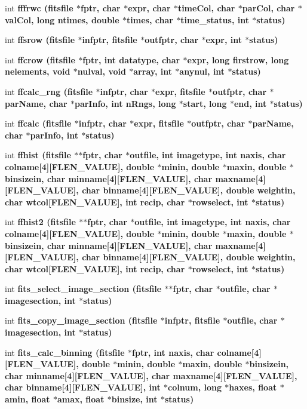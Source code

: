 \begin{CompactItemize}
\item 
int \bf{fffrwc} (\bf{fitsfile} $\ast$fptr, char $\ast$expr, char $\ast$time\-Col, char $\ast$par\-Col, char $\ast$val\-Col, long ntimes, double $\ast$times, char $\ast$time\_\-status, int $\ast$status)
\item 
int \bf{ffsrow} (\bf{fitsfile} $\ast$infptr, \bf{fitsfile} $\ast$outfptr, char $\ast$expr, int $\ast$status)
\item 
int \bf{ffcrow} (\bf{fitsfile} $\ast$fptr, int \bf{datatype}, char $\ast$expr, long firstrow, long nelements, void $\ast$nulval, void $\ast$array, int $\ast$anynul, int $\ast$status)
\item 
int \bf{ffcalc\_\-rng} (\bf{fitsfile} $\ast$infptr, char $\ast$expr, \bf{fitsfile} $\ast$outfptr, char $\ast$par\-Name, char $\ast$par\-Info, int n\-Rngs, long $\ast$start, long $\ast$end, int $\ast$status)
\item 
int \bf{ffcalc} (\bf{fitsfile} $\ast$infptr, char $\ast$expr, \bf{fitsfile} $\ast$outfptr, char $\ast$par\-Name, char $\ast$par\-Info, int $\ast$status)
\item 
int \bf{ffhist} (\bf{fitsfile} $\ast$$\ast$fptr, char $\ast$outfile, int imagetype, int naxis, char colname[4][FLEN\_\-VALUE], double $\ast$minin, double $\ast$maxin, double $\ast$binsizein, char minname[4][FLEN\_\-VALUE], char maxname[4][FLEN\_\-VALUE], char binname[4][FLEN\_\-VALUE], double weightin, char wtcol[FLEN\_\-VALUE], int recip, char $\ast$rowselect, int $\ast$status)
\item 
int \bf{ffhist2} (\bf{fitsfile} $\ast$$\ast$fptr, char $\ast$outfile, int imagetype, int naxis, char colname[4][FLEN\_\-VALUE], double $\ast$minin, double $\ast$maxin, double $\ast$binsizein, char minname[4][FLEN\_\-VALUE], char maxname[4][FLEN\_\-VALUE], char binname[4][FLEN\_\-VALUE], double weightin, char wtcol[FLEN\_\-VALUE], int recip, char $\ast$rowselect, int $\ast$status)
\item 
int \bf{fits\_\-select\_\-image\_\-section} (\bf{fitsfile} $\ast$$\ast$fptr, char $\ast$outfile, char $\ast$imagesection, int $\ast$status)
\item 
int \bf{fits\_\-copy\_\-image\_\-section} (\bf{fitsfile} $\ast$infptr, \bf{fitsfile} $\ast$outfile, char $\ast$imagesection, int $\ast$status)
\item 
int \bf{fits\_\-calc\_\-binning} (\bf{fitsfile} $\ast$fptr, int naxis, char colname[4][FLEN\_\-VALUE], double $\ast$minin, double $\ast$maxin, double $\ast$binsizein, char minname[4][FLEN\_\-VALUE], char maxname[4][FLEN\_\-VALUE], char binname[4][FLEN\_\-VALUE], int $\ast$colnum, long $\ast$haxes, float $\ast$amin, float $\ast$amax, float $\ast$binsize, int $\ast$status)
$$
\end{CompactItemize}
